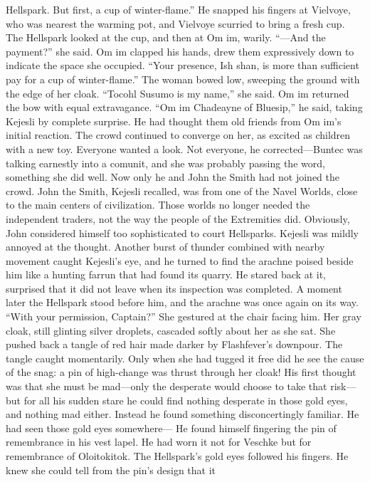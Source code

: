 \documentclass[9pt]{article}
\begin{document}
Hellspark. But first, a cup of winter-flame.” He snapped his fingers at Vielvoye, who was nearest the
warming pot, and Vielvoye scurried to bring a fresh cup.
The Hellspark looked at the cup, and then at Om im, warily. “—And the payment?” she said. Om im
clapped his hands, drew them expressively down to indicate the space she occupied. “Your presence,
Ish shan, is more than sufficient pay for a cup of winter-flame.”
The woman bowed low, sweeping the ground with the edge of her cloak. “Tocohl Susumo is my
name,” she said.
Om im returned the bow with equal extravagance. “Om im Chadeayne of Bluesip,” he said, taking
Kejesli by complete surprise. He had thought them old friends from Om im’s initial reaction.
The crowd continued to converge on her, as excited as children with a new toy. Everyone wanted a
look. Not everyone, he corrected—Buntec was talking earnestly into a comunit, and she was probably
passing the word, something she did well. Now only he and John the Smith had not joined the crowd.
John the Smith, Kejesli recalled, was from one of the Navel Worlds, close to the main centers of
civilization. Those worlds no longer needed the independent traders, not the way the people of the
Extremities did. Obviously, John considered himself too sophisticated to court Hellsparks. Kejesli was
mildly annoyed at the thought.
Another burst of thunder combined with nearby movement caught Kejesli’s eye, and he turned to
find the arachne poised beside him like a hunting farrun that had found its quarry. He stared back at it,
surprised that it did not leave when its inspection was completed. A moment later the Hellspark stood
before him, and the arachne was once again on its way.
“With your permission, Captain?” She gestured at the chair facing him. Her gray cloak, still glinting
silver droplets, cascaded softly about her as she sat. She pushed back a tangle of red hair made darker
by Flashfever’s downpour.
The tangle caught momentarily. Only when she had tugged it free did he see the cause of the snag: a
pin of high-change was thrust through her cloak!
His first thought was that she must be mad—only the desperate would choose to take that risk—but
for all his sudden stare he could find nothing desperate in those gold eyes, and nothing mad either.
Instead he found something disconcertingly familiar. He had seen those gold eyes somewhere—
He found himself fingering the pin of remembrance in his vest lapel. He had worn it not for Veschke
but for remembrance of Oloitokitok.
The Hellspark’s gold eyes followed his fingers. He knew she could tell from the pin’s design that it
\end{document}
